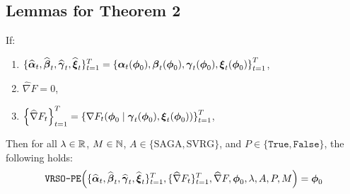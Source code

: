 \subsection{Lemmas for Theorem 2}
    
\begin{lemma}
    If:
    \begin{enumerate}
        \item $\{\widehat {\boldsymbol{\alpha}}_t, \widehat {\boldsymbol{\beta}}_t, \widehat {\boldsymbol{\gamma}}_t, \widehat {\boldsymbol{\xi}}_t\}_{t=1}^T = \left\{\boldsymbol{\alpha}_t(\boldsymbol{\phi}_0),\boldsymbol{\beta}_t(\boldsymbol{\phi}_0),\boldsymbol{\gamma}_t(\boldsymbol{\phi}_0),\boldsymbol{\xi}_t(\boldsymbol{\phi}_0)\right\}_{t=1}^T$,
        \item $\widehat \nabla F = 0$,
        \item $\left\{\widehat \nabla F_t\right\}_{t=1}^T = \left\{\nabla F_t(\boldsymbol{\phi}_0 \mid \boldsymbol{\gamma}_t(\boldsymbol{\phi}_0),\boldsymbol{\xi}_t(\boldsymbol{\phi}_0))\right\}_{t=1}^T$,
    \end{enumerate}
    Then for all $\lambda \in \mathbb{R}$, $M \in \mathbb{N}$, $A \in \{\text{SAGA}, \text{SVRG}\}$, and $P \in \{\texttt{True},\texttt{False}\}$, the following holds:
    \begin{equation}
        \texttt{VRSO-PE}\Big(\{\widehat {\boldsymbol{\alpha}}_t, \widehat {\boldsymbol{\beta}}_t, \widehat {\boldsymbol{\gamma}}_t, \widehat {\boldsymbol{\xi}}_t\}_{t=1}^T, \{\widehat \nabla F_t \}_{t=1}^T, \widehat \nabla F, \boldsymbol{\phi}_0, \lambda, A, P, M \Big) = \boldsymbol{\phi}_0
    \end{equation}
\end{lemma}

